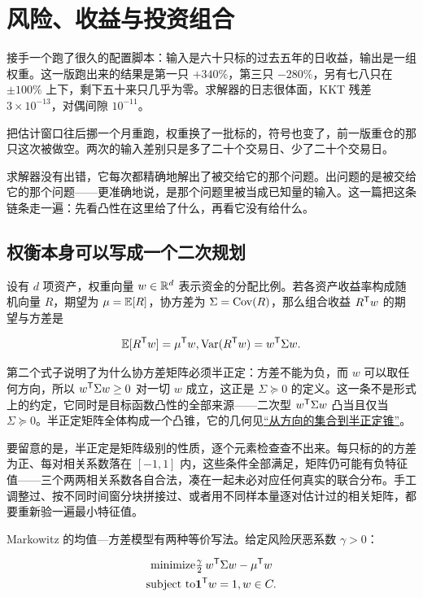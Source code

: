 \section{风险、收益与投资组合}
\label{sec:09-Convex-Optimization/07-Applications/04}

接手一个跑了很久的配置脚本：输入是六十只标的过去五年的日收益，输出是一组权重。这一版跑出来的结果是第一只 \(+340\%\)，第三只 \(-280\%\)，另有七八只在 \(\pm100\%\) 上下，剩下五十来只几乎为零。求解器的日志很体面，KKT 残差 \(3\times10^{-13}\)，对偶间隙 \(10^{-11}\)。

把估计窗口往后挪一个月重跑，权重换了一批标的，符号也变了，前一版重仓的那只这次被做空。两次的输入差别只是多了二十个交易日、少了二十个交易日。

求解器没有出错，它每次都精确地解出了被交给它的那个问题。出问题的是被交给它的那个问题——更准确地说，是那个问题里被当成已知量的输入。这一篇把这条链条走一遍：先看凸性在这里给了什么，再看它没有给什么。

\subsection{权衡本身可以写成一个二次规划}

设有 \(d\) 项资产，权重向量 \(w\in\mathbb{R}^d\) 表示资金的分配比例。若各资产收益率构成随机向量 \(R\)，期望为 \(\mu=\mathbb{E}[R]\)，协方差为 \(\Sigma=\operatorname{Cov}(R)\)，那么组合收益 \(R^{\mathsf{T}}w\) 的期望与方差是

\[
\mathbb{E}[R^{\mathsf{T}}w]=\mu^{\mathsf{T}}w,\space \operatorname{Var}(R^{\mathsf{T}}w)=w^{\mathsf{T}}\Sigma w .
\]

第二个式子说明了为什么协方差矩阵必须半正定：方差不能为负，而 \(w\) 可以取任何方向，所以 \(w^{\mathsf{T}}\Sigma w\ge0\) 对一切 \(w\) 成立，这正是 \(\Sigma\succeq0\) 的定义。这一条不是形式上的约定，它同时是目标函数凸性的全部来源——二次型 \(w^{\mathsf{T}}\Sigma w\) 凸当且仅当 \(\Sigma\succeq0\)。半正定矩阵全体构成一个凸锥，它的几何见\hyperref[sec:09-Convex-Optimization/02-Convex-Sets/03]{``从方向的集合到半正定锥''}。

要留意的是，半正定是矩阵级别的性质，逐个元素检查查不出来。每只标的的方差为正、每对相关系数落在 \([-1,1]\) 内，这些条件全部满足，矩阵仍可能有负特征值——三个两两相关系数各自合法，凑在一起未必对应任何真实的联合分布。手工调整过、按不同时间窗分块拼接过、或者用不同样本量逐对估计过的相关矩阵，都要重新验一遍最小特征值。

Markowitz 的均值---方差模型有两种等价写法。给定风险厌恶系数 \(\gamma>0\)：

\[
\begin{aligned}
\text{minimize}\space & \tfrac{\gamma}{2}\,w^{\mathsf{T}}\Sigma w-\mu^{\mathsf{T}}w\\
\text{subject to}\space & \mathbf{1}^{\mathsf{T}}w=1,\space w\in C .
\end{aligned}
\]

